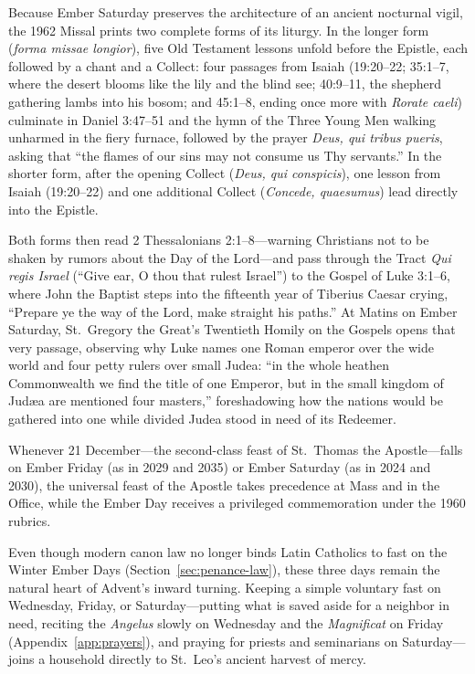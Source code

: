 Because Ember Saturday preserves the architecture of an ancient nocturnal vigil,
the 1962 Missal prints two complete forms of its liturgy. In the longer form
(\textit{forma missae longior}), five Old Testament lessons unfold before the
Epistle, each followed by a chant and a Collect: four passages from Isaiah
(19:20--22; 35:1--7, where the desert blooms like the lily and the blind see;
40:9--11, the shepherd gathering lambs into his bosom; and 45:1--8, ending once
more with \textit{Rorate caeli}) culminate in Daniel 3:47--51 and the hymn of
the Three Young Men walking unharmed in the fiery furnace, followed by the
prayer \textit{Deus, qui tribus pueris}, asking that ``the flames of our sins
may not consume us Thy servants.'' In the shorter form, after the opening
Collect (\textit{Deus, qui conspicis}), one lesson from Isaiah (19:20--22) and
one additional Collect (\textit{Concede, quaesumus}) lead directly into the
Epistle.

Both forms then read 2 Thessalonians 2:1--8---warning Christians not to be
shaken by rumors about the Day of the Lord---and pass through the Tract
\textit{Qui regis Israel} (``Give ear, O thou that rulest Israel'') to the
Gospel of Luke 3:1--6, where John the Baptist steps into the fifteenth year of
Tiberius Caesar crying, ``Prepare ye the way of the Lord, make straight his
paths.'' At Matins on Ember Saturday, St.~Gregory the Great's Twentieth Homily
on the Gospels opens that very passage, observing why Luke names one Roman
emperor over the wide world and four petty rulers over small Judea: ``in the
whole heathen Commonwealth we find the title of one Emperor, but in the small
kingdom of Jud\ae a are mentioned four masters,'' foreshadowing how the nations
would be gathered into one while divided Judea stood in need of its Redeemer.

Whenever 21 December---the second-class feast of St.~Thomas the Apostle---falls
on Ember Friday (as in 2029 and 2035) or Ember Saturday (as in 2024 and 2030),
the universal feast of the Apostle takes precedence at Mass and in the Office,
while the Ember Day receives a privileged commemoration under the 1960 rubrics.

Even though modern canon law no longer binds Latin Catholics to fast on the
Winter Ember Days (Section~\ref{sec:penance-law}), these three days remain the
natural heart of Advent's inward turning. Keeping a simple voluntary fast on
Wednesday, Friday, or Saturday---putting what is saved aside for a neighbor in
need, reciting the \textit{Angelus} slowly on Wednesday and the
\textit{Magnificat} on Friday (Appendix~\ref{app:prayers}), and praying for
priests and seminarians on Saturday---joins a household directly to St.~Leo's
ancient harvest of mercy.

